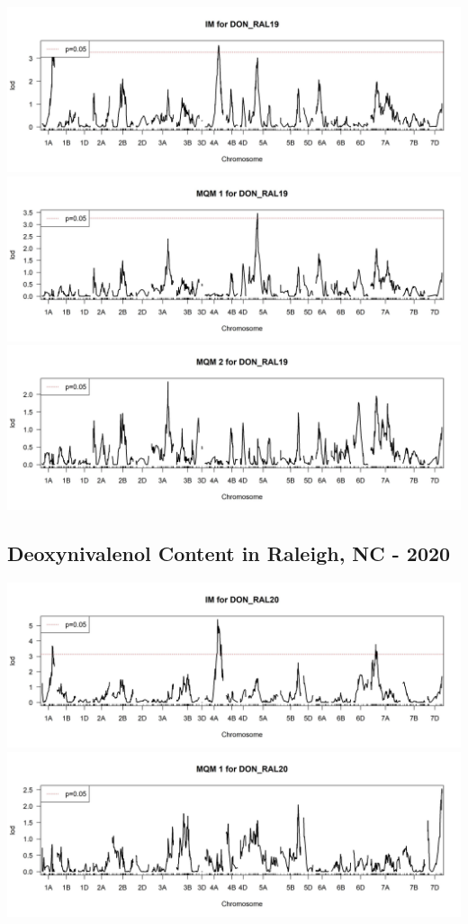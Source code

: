 \documentclass[
]{article}
\begin{document}
\includegraphics{Scan_IM_DON_RAL19.jpg}
\includegraphics{Scan_MQM1_DON_RAL19.jpg}
\includegraphics{Scan_MQM2_DON_RAL19.jpg} \pagebreak

\subsection{Deoxynivalenol Content in Raleigh, NC -
2020}\label{deoxynivalenol-content-in-raleigh-nc---2020}

\includegraphics{Scan_IM_DON_RAL20.jpg}
\includegraphics{Scan_MQM1_DON_RAL20.jpg} \pagebreak
\end{document}
